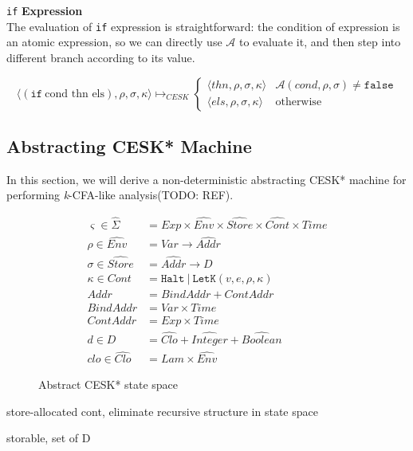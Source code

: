 \documentclass[paper=a4, fontsize=11pt]{scrartcl} %
\numberwithin{equation}{section} %
\numberwithin{figure}{section} %
\numberwithin{table}{section} %
\begin{document}
\texttt{if} \textbf{Expression}\\
The evaluation of \texttt{if} expression is straightforward: the condition of expression is an atomic expression, so we can directly use $\mathcal{A}$ to evaluate it, and then step into different branch according to its value.

$$ \langle (\texttt{if}~\text{cond thn els}), \rho, \sigma, \kappa \rangle \longmapsto_{CESK} 
\begin{cases}
\langle thn, \rho, \sigma, \kappa \rangle & \mathcal{A}(cond, \rho, \sigma) \neq \texttt{false}
\\
\langle els, \rho, \sigma, \kappa \rangle & \text{otherwise}
\end{cases}$$


\subsection{Abstracting CESK* Machine}

In this section, we will derive a non-deterministic abstracting CESK* machine for performing \textit{k}-CFA-like analysis(TODO: REF).

\begin{figure}[h!]
\begin{align*}
\varsigma \in \widehat{\Sigma} & = Exp \times \widehat{Env} \times \widehat{Store} \times \widehat{Cont} \times Time \\
\rho \in \widehat{Env} & = Var \rightarrow \widehat{Addr} \\
\sigma \in \widehat{Store} & = \widehat{Addr} \rightarrow D \\
\kappa \in Cont & = \texttt{Halt} ~|~ \texttt{LetK}(v,e,\rho,\kappa) \\
Addr & = BindAddr + ContAddr \\
BindAddr &= Var \times Time \\
ContAddr &= Exp \times Time \\
d \in D & = \widehat{Clo} + \widehat{Integer} + \widehat{Boolean} \\
clo \in \widehat{Clo} & = Lam \times \widehat{Env}
\end{align*}
\caption{Abstract CESK* state space}
\label{fig:abstractcesk}
\end{figure}

store-allocated cont, eliminate recursive structure in state space

storable, set of D
\end{document}
